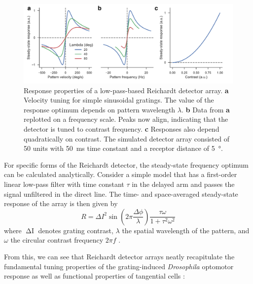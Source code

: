 \begin{figure}
    \centering
    \includegraphics[width=1.03\textwidth]{graphics/figure_rd}
    \caption[Response properties of the Reichardt detector]
    {Response properties of a low-pass-based Reichardt detector array. \textbf{a} Velocity tuning for simple sinusoidal gratings. The value of the response optimum depends on pattern wavelength $\lambda$. \textbf{b} Data from \textbf{a} replotted on a frequency scale. Peaks now align, indicating that the detector is tuned to contrast frequency. \textbf{c} Responses also depend quadratically on contrast. The simulated detector array consisted of 50 units with \SI{50}{\milli\second} time constant and a receptor distance of \SI{5}{\degree}.}
    \label{fig:tuning}
\end{figure}

For specific forms of the Reichardt detector, the steady-state frequency optimum can be calculated analytically. Consider a simple model that has a first-order linear low-pass filter with time constant $\tau$ in the delayed arm and passes the signal unfiltered in the direct line. The time- and space-averaged steady-state response of the array is then given by
\begin{equation}
    R = {\Delta I}^2 \sin(2 \pi \frac{\Delta\phi}{\lambda}) \frac{\tau \omega}{1 + \tau^2 \omega^2}
\end{equation}
where $\mathop{\Delta I}$ denotes grating contrast, $\lambda$ the spatial wavelength of the pattern, and $\omega$ the circular contrast frequency $2 \pi f$ \citep{Borst:2003bz}.

From this, we can see that Reichardt detector arrays neatly recapitulate the fundamental tuning properties of the grating-induced \textit{Drosophila} optomotor response \citep{Gotz:1964bj} as well as functional properties of tangential cells \citep{Joesch:2008fo}:

